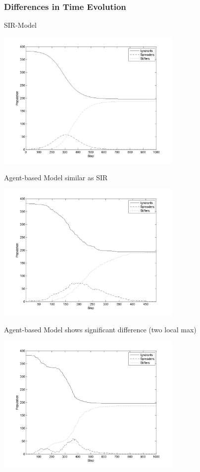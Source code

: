\documentclass{beamer}
\begin{document}
\begin{frame}
\frametitle{Differences in Time Evolution}
\begin{center}
SIR-Model
\end{center}
\begin{center}
\includegraphics[width=9cm]{NICE_SIR}
\end{center}
\end{frame}

\begin{frame}
\begin{center}
Agent-based Model similar as SIR
\end{center}
\begin{center}
\includegraphics[width=9cm]{1-local-max}
\end{center}
\end{frame}

\begin{frame}
\begin{center}
Agent-based Model shows significant difference (two local max)
\end{center}
\begin{center}
\includegraphics[width=9cm]{2-local-max}
\end{center}
\end{frame}
\end{document}
